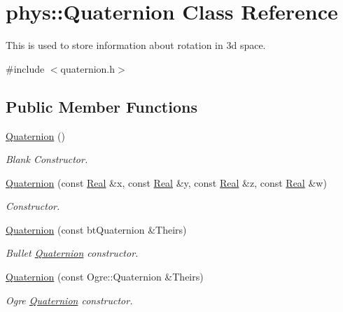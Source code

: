 \hypertarget{classphys_1_1Quaternion}{
\section{phys::Quaternion Class Reference}
\label{df/d8c/classphys_1_1Quaternion}
}


This is used to store information about rotation in 3d space.  




{\ttfamily \#include $<$quaternion.h$>$}

\subsection*{Public Member Functions}
\begin{DoxyCompactItemize}
\item 
\hyperlink{classphys_1_1Quaternion_aca4ee6fd6d3967f06cc4a32361fa5a62}{Quaternion} ()
\begin{DoxyCompactList}\small\item\em Blank Constructor. \item\end{DoxyCompactList}\item 
\hyperlink{classphys_1_1Quaternion_ac8037875c08ce10c0195f3e6fd08b172}{Quaternion} (const \hyperlink{namespacephys_af7eb897198d265b8e868f45240230d5f}{Real} \&x, const \hyperlink{namespacephys_af7eb897198d265b8e868f45240230d5f}{Real} \&y, const \hyperlink{namespacephys_af7eb897198d265b8e868f45240230d5f}{Real} \&z, const \hyperlink{namespacephys_af7eb897198d265b8e868f45240230d5f}{Real} \&w)
\begin{DoxyCompactList}\small\item\em Constructor. \item\end{DoxyCompactList}\item 
\hyperlink{classphys_1_1Quaternion_ab9f13d19fe7d602d7c5feaed0aaf4620}{Quaternion} (const btQuaternion \&Theirs)
\begin{DoxyCompactList}\small\item\em Bullet \hyperlink{classphys_1_1Quaternion}{Quaternion} constructor. \item\end{DoxyCompactList}\item 
\hyperlink{classphys_1_1Quaternion_a4902c05489ebae03a55433d947c53d03}{Quaternion} (const Ogre::Quaternion \&Theirs)
\begin{DoxyCompactList}\small\item\em Ogre \hyperlink{classphys_1_1Quaternion}{Quaternion} constructor. \item\end{DoxyCompactList}\item 

\end{DoxyCompactItemize}

